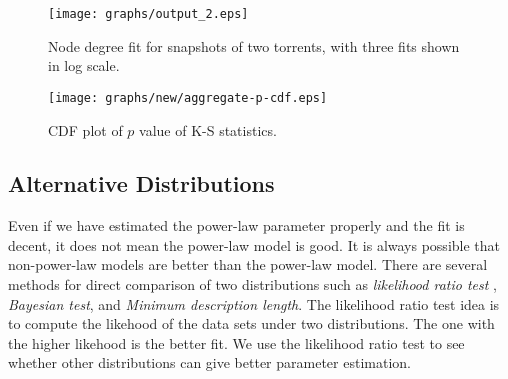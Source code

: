 \documentclass[paper]{ieice}
\begin{document}
\begin{figure}[!tb]
\begin{center}
\texttt{[image: graphs/output\_2.eps]}
\end{center}
\caption{Node degree fit for snapshots of two torrents, with three fits shown in log scale.} 
\label{fig:fitting}
\vspace{-2mm}
\end{figure}

\begin{figure}[!tb]
\begin{center}
\texttt{[image: graphs/new/aggregate-p-cdf.eps]}
\end{center}
\caption{CDF plot of $p$ value of K-S statistics.} 
\label{fig:cdf-p}
\vspace{-2mm}
\end{figure}

\subsection{Alternative Distributions}
Even if we have estimated the power-law parameter properly and the fit is decent, it does not mean the power-law model is good.
It is always possible that non-power-law models are better than the power-law model.
There are several methods for direct comparison of two distributions such as \textit{likelihood ratio test} \cite{vuong1989likelihood}, \textit{Bayesian test}, and \textit{Minimum description length}.
The likelihood ratio test idea is to compute the likehood of the data sets under two distributions. 
The one with the higher likehood is the better fit. 
We use the likelihood ratio test to see whether other distributions can give better parameter estimation.
\end{document}
